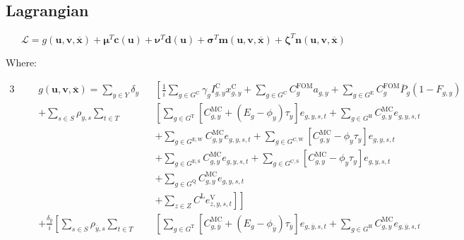 \documentclass{article}
\newcommand{\sGeneratorsExisting}{G^{\mathrm{E}}}
\newcommand{\sGeneratorsExistingWind}{G^{\mathrm{E,W}}}
\newcommand{\sGeneratorsExistingSolar}{G^{\mathrm{E,S}}}
\newcommand{\sGeneratorsCandidate}{G^{\mathrm{C}}}
\newcommand{\sGeneratorsCandidateWind}{G^{\mathrm{C,W}}}
\newcommand{\sGeneratorsCandidateSolar}{G^{\mathrm{C,S}}}
\newcommand{\sGeneratorsThermal}{G^{\mathrm{T}}}
\newcommand{\sGeneratorsHydro}{G^{\mathrm{H}}}
\newcommand{\sStorage}{G^{\mathrm{Q}}}
\newcommand{\sYears}{Y}
\newcommand{\sScenarios}{S}
\newcommand{\sIntervals}{T}
\newcommand{\sZones}{Z}
\newcommand{\iGenerator}{g}
\newcommand{\iYear}{y}
\newcommand{\iYearTerminal}{\overline{\iYear}}
\newcommand{\iScenario}{s}
\newcommand{\iInterval}{t}
\newcommand{\iZone}{z}
\newcommand{\cFixedOperationsMaintenanceCostGenerator}[1][\iGenerator]{C^{\mathrm{FOM}}_{#1}}
\newcommand{\cScenarioDuration}[1][\iYear,\iScenario]{\rho_{#1}}
\newcommand{\cMarginalCost}[1][\iGenerator,\iYear]{C^{\mathrm{MC}}_{#1}}
\newcommand{\cEmissionsIntensity}[1][\iGenerator]{E_{#1}}
\newcommand{\cPowerOutputMax}[1][\iGenerator,\iYear]{\overline{P}_{#1}}
\newcommand{\cAmortisationRate}[1][\iGenerator]{\gamma_{#1}}
\newcommand{\cCandidateInvestmentCost}[1][\iGenerator,\iYear]{I^{\mathrm{C}}_{#1}}
\newcommand{\cInterestRate}{i}
\newcommand{\cLostLoadCost}{C^{\mathrm{L}}}
\newcommand{\cRetirementIndicator}[1][\iGenerator,\iYear]{F_{#1}}
\newcommand{\cDiscountRate}[1][\iYear]{\delta_{#1}}
\newcommand{\vBaseline}[1][\iYear]{\phi_{#1}}
\newcommand{\vPermitPrice}[1][\iYear]{\tau_{#1}}
\newcommand{\vEnergy}[1][\iGenerator,\iYear,\iScenario,\iInterval]{e_{#1}}
\newcommand{\vInstalledCapacity}[1][\iGenerator,\iYear]{x^{\mathrm{C}}_{#1}}
\newcommand{\vLostLoadEnergy}[1][\iZone,\iYear,\iScenario,\iInterval]{e^{\mathrm{V}}_{#1}}
\newcommand{\vInstalledCapacityTotal}[1][\iGenerator,\iYear]{a_{#1}}
\begin{document}
\subsection{Lagrangian}

\begin{equation}
	\mathcal{L} = g(\bm{u}, \bm{v}, \overline{\bm{x}}) + \bm{\mu}^{T}\bm{c}(\bm{u}) + \bm{\nu}^{T}\bm{d}(\bm{u}) + \bm{\sigma}^{T}\bm{m}(\bm{u}, \bm{v}, \bm{\overline{x}}) + \bm{\zeta}^{T} \bm{n}(\bm{u}, \bm{v}, \bm{\overline{x}})
\end{equation}

Where:

\begin{alignat}{3}
	& && g(\bm{u}, \bm{v}, \overline{\bm{x}}) = \sum\limits_{\iYear \in \sYears} \cDiscountRate  &&  \left[\frac{1}{\cInterestRate} \sum\limits_{g\in \sGeneratorsCandidate} \cAmortisationRate  \cCandidateInvestmentCost \vInstalledCapacity + \sum\limits_{\iGenerator \in \sGeneratorsCandidate} \cFixedOperationsMaintenanceCostGenerator \vInstalledCapacityTotal + \sum\limits_{\iGenerator \in \sGeneratorsExisting} \cFixedOperationsMaintenanceCostGenerator \cPowerOutputMax[\iGenerator] \left(1 - \cRetirementIndicator\right) \right. \nonumber\\ 
	& && + \sum\limits_{\iScenario \in \sScenarios} \cScenarioDuration \sum\limits_{\iInterval \in \sIntervals} && \left[\sum\limits_{\iGenerator \in \sGeneratorsThermal} \left[\cMarginalCost + (\cEmissionsIntensity - \vBaseline)\vPermitPrice\right]\vEnergy  + \sum\limits_{\iGenerator \in \sGeneratorsHydro}\cMarginalCost \vEnergy \right. \nonumber\\
	& && && + \sum\limits_{\iGenerator \in \sGeneratorsExistingWind} \cMarginalCost \vEnergy + \sum\limits_{\iGenerator \in \sGeneratorsCandidateWind} \left[\cMarginalCost - \vBaseline \vPermitPrice\right] \vEnergy \nonumber\\
	& && && + \sum\limits_{\iGenerator \in \sGeneratorsExistingSolar} \cMarginalCost \vEnergy + \sum\limits_{\iGenerator \in \sGeneratorsCandidateSolar} \left[\cMarginalCost - \vBaseline\vPermitPrice\right] \vEnergy \nonumber\\
	& && && + \sum\limits_{\iGenerator \in \sStorage} \cMarginalCost \vEnergy \nonumber\\
	& && && \left.\left. + \sum\limits_{\iZone \in \sZones} \cLostLoadCost \vLostLoadEnergy \right]\right] \nonumber\\
	& && + \frac{\cDiscountRate[\iYearTerminal]}{\cInterestRate} \left[\sum\limits_{\iScenario \in \sScenarios}  \cScenarioDuration[\iYearTerminal,\iScenario] \sum\limits_{\iInterval \in \sIntervals} \right. && \left[\sum\limits_{\iGenerator \in \sGeneratorsThermal} \left[\cMarginalCost[\iGenerator,\iYearTerminal] + (\cEmissionsIntensity - \vBaseline[\iYearTerminal])\vPermitPrice[\iYearTerminal]\right]\vEnergy[\iGenerator,\iYearTerminal,\iScenario,\iInterval]  + \sum\limits_{\iGenerator \in \sGeneratorsHydro}\cMarginalCost \vEnergy[\iGenerator,\iYearTerminal,\iScenario,\iInterval] \right. \nonumber\\

\end{alignat}
\end{document}
